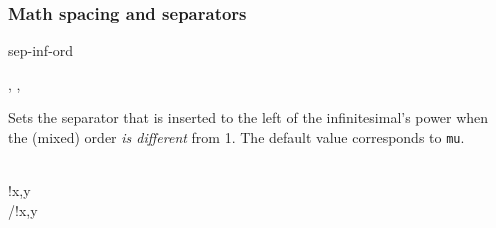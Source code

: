 \subsubsection*{Math spacing and separators}

\begin{option}{sep-inf-ord}
	\begin{values}[default = 0]
		, , 
	\end{values}
	Sets the separator that is inserted to the left of the infinitesimal's power when the (mixed) order \emph{is different} from \num{1}. The default value corresponds to  \texttt{mu}.
	\begin{example}
		 \\
		!{x,y} \\
		/!{x,y}
	\end{example}
\end{option}


